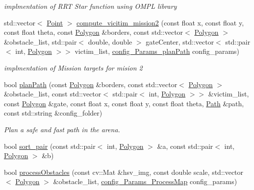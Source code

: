 \begin{DoxyCompactItemize}
\begin{DoxyCompactList}\small\item\em implmentation of R\+RT Star function using O\+M\+PL library \end{DoxyCompactList}\item 
std\+::vector$<$ \hyperlink{structPoint}{Point} $>$ \hyperlink{namespacestudent_a6d911d7d7118f5393eeb575e0e76cdf6}{compute\+\_\+vicitim\+\_\+mission2} (const float x, const float y, const float theta, const \hyperlink{utils_8hpp_a18281038c49470960bd8f4d15b893441}{Polygon} \&borders, const std\+::vector$<$ \hyperlink{utils_8hpp_a18281038c49470960bd8f4d15b893441}{Polygon} $>$ \&obstacle\+\_\+list, std\+::pair$<$ double, double $>$ gate\+Center, std\+::vector$<$ std\+::pair$<$ int, \hyperlink{utils_8hpp_a18281038c49470960bd8f4d15b893441}{Polygon} $>$$>$ victim\+\_\+list, \hyperlink{classconfig__Params__planPath}{config\+\_\+\+Params\+\_\+plan\+Path} config\+\_\+params)
\begin{DoxyCompactList}\small\item\em implmentation of Mission targets for mision 2 \end{DoxyCompactList}\item 
bool \hyperlink{namespacestudent_acfe62076a49d23bb083f2f880fd24c77}{plan\+Path} (const \hyperlink{utils_8hpp_a18281038c49470960bd8f4d15b893441}{Polygon} \&borders, const std\+::vector$<$ \hyperlink{utils_8hpp_a18281038c49470960bd8f4d15b893441}{Polygon} $>$ \&obstacle\+\_\+list, const std\+::vector$<$ std\+::pair$<$ int, \hyperlink{utils_8hpp_a18281038c49470960bd8f4d15b893441}{Polygon} $>$$>$ \&victim\+\_\+list, const \hyperlink{utils_8hpp_a18281038c49470960bd8f4d15b893441}{Polygon} \&gate, const float x, const float y, const float theta, \hyperlink{structPath}{Path} \&path, const std\+::string \&config\+\_\+folder)
\begin{DoxyCompactList}\small\item\em Plan a safe and fast path in the arena. \end{DoxyCompactList}\item 
bool \hyperlink{namespacestudent_a5ae5c8a6b753e8c2f86e2a6f70c44faf}{sort\+\_\+pair} (const std\+::pair$<$ int, \hyperlink{utils_8hpp_a18281038c49470960bd8f4d15b893441}{Polygon} $>$ \&a, const std\+::pair$<$ int, \hyperlink{utils_8hpp_a18281038c49470960bd8f4d15b893441}{Polygon} $>$ \&b)
\item 
bool \hyperlink{namespacestudent_a18b392b6e41e30b0e80eadf53d6d890b}{process\+Obstacles} (const cv\+::\+Mat \&hsv\+\_\+img, const double scale, std\+::vector$<$ \hyperlink{utils_8hpp_a18281038c49470960bd8f4d15b893441}{Polygon} $>$ \&obstacle\+\_\+list, \hyperlink{classconfig__Params__ProcessMap}{config\+\_\+\+Params\+\_\+\+Process\+Map} config\+\_\+params)

\end{DoxyCompactItemize}
